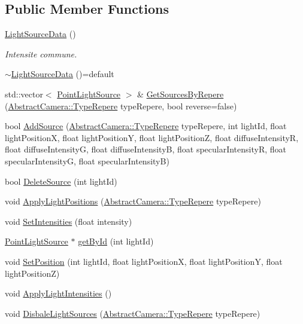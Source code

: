 \subsection*{Public Member Functions}
\begin{DoxyCompactItemize}
\item 
\hyperlink{struct_light_source_data_a0862cd4423045f379a724594f5a7f7f2}{Light\+Source\+Data} ()
\begin{DoxyCompactList}\small\item\em Intensite commune. \end{DoxyCompactList}\item 
\hyperlink{struct_light_source_data_a6b7b1d0213c0aa6eccf9a521794aca9f}{$\sim$\+Light\+Source\+Data} ()=default
\item 
std\+::vector$<$ \hyperlink{struct_light_source_data_1_1_point_light_source}{Point\+Light\+Source} $>$ \& \hyperlink{struct_light_source_data_a4243a55e8ef7a65d58403bc7be09e7db}{Get\+Sources\+By\+Repere} (\hyperlink{class_abstract_camera_a4d3cc29d2eb150eada1bb387648eae98}{Abstract\+Camera\+::\+Type\+Repere} type\+Repere, bool reverse=false)
\item 
bool \hyperlink{struct_light_source_data_a575b34d80813c9057e8e4bdbc60e53c1}{Add\+Source} (\hyperlink{class_abstract_camera_a4d3cc29d2eb150eada1bb387648eae98}{Abstract\+Camera\+::\+Type\+Repere} type\+Repere, int light\+Id, float light\+Position\+X, float light\+Position\+Y, float light\+Position\+Z, float diffuse\+Intensity\+R, float diffuse\+Intensity\+G, float diffuse\+Intensity\+B, float specular\+Intensity\+R, float specular\+Intensity\+G, float specular\+Intensity\+B)
\item 
bool \hyperlink{struct_light_source_data_a586f688bed495b5e65c44a7abb3a4aa5}{Delete\+Source} (int light\+Id)
\item 
void \hyperlink{struct_light_source_data_a3e8626770e095c13a5516d98e4fe4979}{Apply\+Light\+Positions} (\hyperlink{class_abstract_camera_a4d3cc29d2eb150eada1bb387648eae98}{Abstract\+Camera\+::\+Type\+Repere} type\+Repere)
\item 
void \hyperlink{struct_light_source_data_a1a6b5906207c5db3d0b31b39df05ee2d}{Set\+Intensities} (float intensity)
\item 
\hyperlink{struct_light_source_data_1_1_point_light_source}{Point\+Light\+Source} $\ast$ \hyperlink{struct_light_source_data_a9e714f885cb556ccb658a80f4045dc1e}{get\+By\+Id} (int light\+Id)
\item 
void \hyperlink{struct_light_source_data_abc7c8e215ee1d29fdd774f01c92e7563}{Set\+Position} (int light\+Id, float light\+Position\+X, float light\+Position\+Y, float light\+Position\+Z)
\item 
void \hyperlink{struct_light_source_data_a9127f39068b76f1f68e86d8f393f5bb8}{Apply\+Light\+Intensities} ()
\item 
void \hyperlink{struct_light_source_data_a2544f01b74dd0fb023b9edbee74181f8}{Disbale\+Light\+Sources} (\hyperlink{class_abstract_camera_a4d3cc29d2eb150eada1bb387648eae98}{Abstract\+Camera\+::\+Type\+Repere} type\+Repere)
\end{DoxyCompactItemize}
